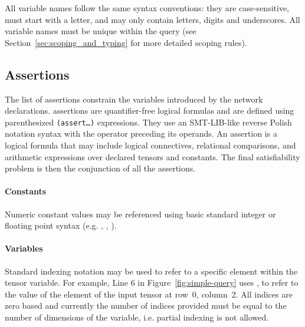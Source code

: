 All variable names follow the same syntax conventions: they are case-sensitive, must start with a letter, and may only contain letters, digits and underscores. All variable names must be unique within the query (see Section~\ref{sec:scoping_and_typing} for more detailed scoping rules). 



\subsection{Assertions}

The list of assertions constrain the variables introduced by the network declarations. \vnnlib{} assertions are quantifier-free logical formulas and are defined using parenthesized \texttt{(assert\ldots)} expressions. 
They use an SMT-LIB-like reverse Polish notation syntax with the operator preceding its operands.
An assertion is a logical formula that may include logical connectives, relational comparisons, and arithmetic expressions over declared tensors and constants.
The final satisfiability problem is then the conjunction of all the assertions.
 
\paragraph{Constants}

Numeric constant values may be referenced using basic standard integer or floating point syntax (e.g. , , ). 

\paragraph{Variables} 

Standard indexing notation may be used to refer to a specific element within the tensor variable. For example, Line 6 in Figure~\ref{fig:simple-query} uses , to refer to the value of the element of the input tensor at row~0, column~2. All indices are zero based and currently the number of indices provided must be equal to the number of dimensions of the variable, i.e. partial indexing is not allowed.

